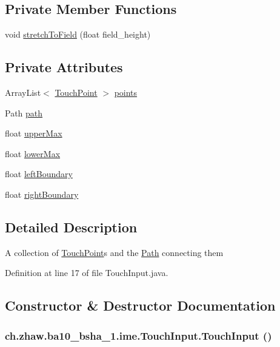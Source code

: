 \subsection*{Private Member Functions}
\begin{DoxyCompactItemize}
\item 
void \hyperlink{classch_1_1zhaw_1_1ba10__bsha__1_1_1ime_1_1TouchInput_ae2b9a9c1de66611330905b922310cc7c}{stretchToField} (float field\_\-height)
\end{DoxyCompactItemize}
\subsection*{Private Attributes}
\begin{DoxyCompactItemize}
\item 
ArrayList$<$ \hyperlink{classch_1_1zhaw_1_1ba10__bsha__1_1_1TouchPoint}{TouchPoint} $>$ \hyperlink{classch_1_1zhaw_1_1ba10__bsha__1_1_1ime_1_1TouchInput_a03a322fbe00768dea16f01801bdcc3b8}{points}
\item 
Path \hyperlink{classch_1_1zhaw_1_1ba10__bsha__1_1_1ime_1_1TouchInput_ae40ac5199f39cda2322b9b74b4f388aa}{path}
\item 
float \hyperlink{classch_1_1zhaw_1_1ba10__bsha__1_1_1ime_1_1TouchInput_a30f650d3ad8ed1df80b13bf4b6a90ccd}{upperMax}
\item 
float \hyperlink{classch_1_1zhaw_1_1ba10__bsha__1_1_1ime_1_1TouchInput_aaab22f154cdbb07626714d84b808a68a}{lowerMax}
\item 
float \hyperlink{classch_1_1zhaw_1_1ba10__bsha__1_1_1ime_1_1TouchInput_aaaec1a7c1eb29dde413a37e18fe9eaac}{leftBoundary}
\item 
float \hyperlink{classch_1_1zhaw_1_1ba10__bsha__1_1_1ime_1_1TouchInput_a2006af7bf2e20ee8082b41b0ff80810a}{rightBoundary}
\end{DoxyCompactItemize}


\subsection{Detailed Description}
A collection of \hyperlink{classch_1_1zhaw_1_1ba10__bsha__1_1_1TouchPoint}{TouchPoint}s and the \hyperlink{}{Path} connecting them 

Definition at line 17 of file TouchInput.java.

\subsection{Constructor \& Destructor Documentation}
\hypertarget{classch_1_1zhaw_1_1ba10__bsha__1_1_1ime_1_1TouchInput_a35e5a2dafdadf1379ce628ff01dec0f6}{
\subsubsection[{TouchInput}]{\setlength{\rightskip}{0pt plus 5cm}ch.zhaw.ba10\_\-bsha\_\-1.ime.TouchInput.TouchInput ()}}
\label{classch_1_1zhaw_1_1ba10__bsha__1_1_1ime_1_1TouchInput_a35e5a2dafdadf1379ce628ff01dec0f6}


